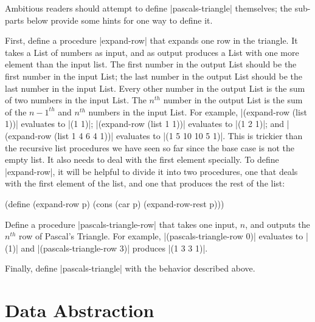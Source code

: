 \begin{schemeregion}
{Ambitious readers should attempt to define \scheme|pascals-triangle| themselves; the sub-parts below provide some hints for one way to define it.
\begin{subexerciselist}
\item First, define a procedure \scheme|expand-row| that expands one row in the triangle.  It takes a List of numbers as input, and as output produces a List with one more element than the input list.  The first number in the output List should be the first number in the input List; the last number in the output List should be the last number in the input List.  Every other number in the output List is the sum of two numbers in the input List.  The $n^{th}$ number in the output List is the sum of the $n-1^{th}$ and $n^{th}$ numbers in the input List.  For example, \scheme|(expand-row (list 1))| evaluates to \scheme|(1 1)|; \scheme|(expand-row (list 1 1))| evaluates to \scheme|(1 2 1)|; and \scheme|(expand-row (list 1 4 6 4 1))| evaluates to \scheme|(1 5 10 10 5 1)|.  This is trickier than the recursive list procedures we have seen so far since the base case is not the empty list.  It also needs to deal with the first element specially.  To define \scheme|expand-row|, it will be helpful to divide it into two procedures, one that deals with the first element of the list, and one that produces the rest of the list:
\begin{schemedisplay}
(define (expand-row p) (cons (car p) (expand-row-rest p)))
\end{schemedisplay}

\item Define a procedure \scheme|pascals-triangle-row| that takes one input, $n$, and outputs the $n^{th}$ row of Pascal's Triangle.  For example, \scheme|(pascals-triangle-row 0)| evaluates to \scheme|(1)| and \scheme|(pascals-triangle-row 3)| produces \schemeresult|(1 3 3 1)|.

\item Finally, define \scheme|pascals-triangle| with the behavior described above.

\end{subexerciselist}
}

\section{Data Abstraction}\label{sec:dataabstraction}	


\end{schemeregion}

